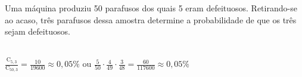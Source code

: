 \begin{ex}
Uma máquina produziu 50 parafusos dos quais 5 eram defeituosos. Retirando-se ao acaso, três parafusos dessa amostra determine a probabilidade de que os três sejam defeituosos.
  \begin{sol}
   \phantom{A} \\
   $\frac{\mathrm{C}_{5,3}}{\mathrm{C}_{{50},3}}= \frac{10}{19600}\approx 0,05\%$
   ou $\frac{5}{50}\cdot\frac{4}{49}\cdot\frac{3}{48}=\frac{60}{117600}\approx 0,05\%$
  \end{sol}
\end{ex}